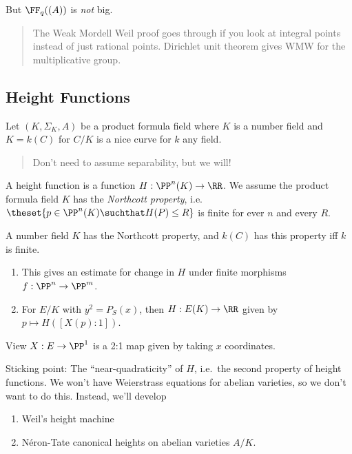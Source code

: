 But \(\FF_q((A))\) is \emph{not} big.

\begin{quote}
The Weak Mordell Weil proof goes through if you look at integral points
instead of just rational points. Dirichlet unit theorem gives WMW for
the multiplicative group.
\end{quote}

\hypertarget{height-functions-1}{%
\subsection{Height Functions}\label{height-functions-1}}

Let \((K, \Sigma_K, A)\) be a product formula field where \(K\) is a
number field and \(K = k(C)\) for \(C/K\) is a nice curve for \(k\) any
field.

\begin{quote}
Don't need to assume separability, but we will!
\end{quote}

A height function is a function \(H: \PP^n(K) \to \RR\). We assume the
product formula field \(K\) has the \emph{Northcott property},
i.e.~\(\theset{ p\in \PP^n(K) \suchthat H(P) \leq R }\) is finite for
ever \(n\) and every \(R\).

\begin{description}
\tightlist
\item[Remark]
A number field \(K\) has the Northcott property, and \(k(C)\) has this
property iff \(k\) is finite.
\end{description}

\begin{enumerate}
\def\labelenumi{\arabic{enumi}.}
\tightlist
\item
  This gives an estimate for change in \(H\) under finite morphisms
  \(f: \PP^n \to \PP^m\).
\item
  For \(E/K\) with \(y^2 = P_S(x)\), then \(H: E(K) \to \RR\) given by
  \(p\mapsto H([X(p): 1])\).
\end{enumerate}

View \(X: E \to \PP^1\) is a 2:1 map given by taking \(x\) coordinates.

Sticking point: The ``near-quadraticity'' of \(H\), i.e.~the second
property of height functions. We won't have Weierstrass equations for
abelian varieties, so we don't want to do this. Instead, we'll develop

\begin{enumerate}
\def\labelenumi{\arabic{enumi}.}
\tightlist
\item
  Weil's height machine
\item
  Néron-Tate canonical heights on abelian varieties \(A/K\).
\end{enumerate}

